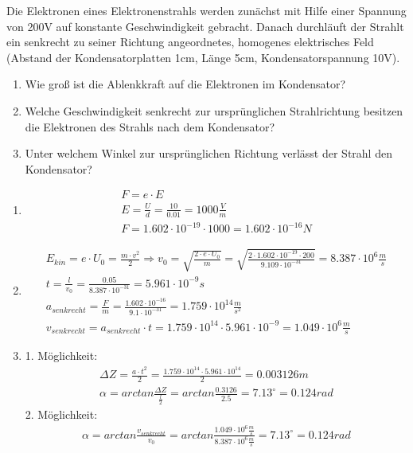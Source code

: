 \documentclass[12pt,a4paper,ngerman]{article}
\begin{document}
\begin{framed}
Die Elektronen eines Elektronenstrahls werden zunächst mit Hilfe einer Spannung von 200V auf konstante Geschwindigkeit gebracht. Danach durchläuft der Strahlt ein senkrecht zu seiner Richtung angeordnetes, homogenes elektrisches Feld (Abstand der Kondensatorplatten 1cm, Länge 5cm, Kondensatorspannung 10V).
\begin{enumerate}
\item Wie groß ist die Ablenkkraft auf die Elektronen im Kondensator?
\item Welche Geschwindigkeit senkrecht zur ursprünglichen Strahlrichtung besitzen die Elektronen des Strahls nach dem Kondensator?
\item Unter welchem Winkel zur ursprünglichen Richtung verlässt der Strahl den Kondensator?
\end{enumerate}
\end{framed}

\begin{enumerate}
\item \begin{gather*}
F = e \cdot E \\
E = \frac{U}{d} = \frac{10}{0.01} = 1000 \frac{V}{m} \\
F = 1.602 \cdot 10^{-19}\cdot 1000 = 1.602 \cdot 10^{-16}N
\end{gather*}
\item \begin{gather*}
E_{kin} = e \cdot U_0  = \frac{m \cdot v^2}{2} \Rightarrow v_0 = \sqrt{\frac{2 \cdot e \cdot U_0}{m}} = \sqrt{\frac{2 \cdot 1.602 \cdot 10^{-19}\cdot 200}{9.109 \cdot 10^{-31}}} = 8.387 \cdot 10^6 \frac{m}{s} \\
t = \frac{l}{v_0} = \frac{0.05}{8.387 \cdot 10^{-31}} = 5.961 \cdot 10^{-9}s \\
a_{senkrecht} = \frac{F}{m} = \frac{1.602 \cdot 10^{-16}}{9.1 \cdot 10^{-31}} = 1.759 \cdot 10^{14} \frac{m}{s^2} \\
v_{senkrecht} = a_{senkrecht} \cdot t = 1.759 \cdot 10^{14} \cdot 5.961 \cdot 10^{-9} = 1.049 \cdot 10^6 \frac{m}{s}
\end{gather*}
\pagebreak
\item 1. Möglichkeit: 
\begin{gather*}
\Delta Z = \frac{a \cdot t^2}{2} = \frac{1.759 \cdot 10^{14} \cdot 5.961 \cdot 10^{14}}{2} = 0.003126m \\
\alpha = arctan \frac{\Delta Z}{\frac{l}{2}} = arctan \frac{0.3126}{2.5}= 7.13^\circ = 0.124 rad
\end{gather*}
2. Möglichkeit:
\begin{gather*}
\alpha = arctan\frac{v_{senkrecht}}{v_0} = arctan\frac{1.049 \cdot 10^6 \frac{m}{s}}{8.387 \cdot 10^{6}\frac{m}{s}} = 7.13^\circ = 0.124 rad
\end{gather*}
\end{enumerate}
\end{document}
